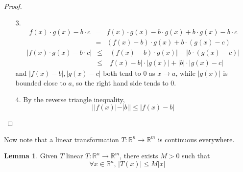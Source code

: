 \documentclass[a4paper,14pt]{extarticle}
\theoremstyle{definition}
\newtheorem*{lemma}{Lemma}
\begin{document}
\begin{proof} \hfill
	\begin{enumerate}
		\item[3.] \begin{eqnarray*}
				f(x)\cdot g(x)-b\cdot c&=&f(x)\cdot g(x)-b\cdot g(x) + b\cdot g(x)-b\cdot c \\
					&=&(f(x)-b)\cdot g(x) + b\cdot(g(x)-c)
			\end{eqnarray*}
			\begin{eqnarray*}
				|f(x)\cdot g(x)-b\cdot c|&\leq&|(f(x)-b)\cdot g(x)|+|b\cdot(g(x)-c)| \\
				&\leq&|f(x)-b|\cdot|g(x)|+|b|\cdot|g(x)-c|
			\end{eqnarray*}
			and $|f(x)-b|, |g(x)-c|$ both tend to 0 as $x\to a$, while $|g(x)|$ is bounded close to $a$, so the right hand side tends to 0.
		\item[4.] By the reverse triangle inequality, \[||f(x)|-|b||\leq|f(x)-b|\]
	\end{enumerate}
\end{proof}

Now note that a linear transformation $T:\mathbb{R}^n\rightarrow\mathbb{R}^m$ is continuous everywhere.

\begin{lemma}
	Given $T$ linear $T:\mathbb{R}^n\rightarrow\mathbb{R}^m$, there exists $M>0$ such that \[\forall x\in\mathbb{R}^n, \,|T(x)|\leq M|x|\]
\end{lemma}
\end{document}
